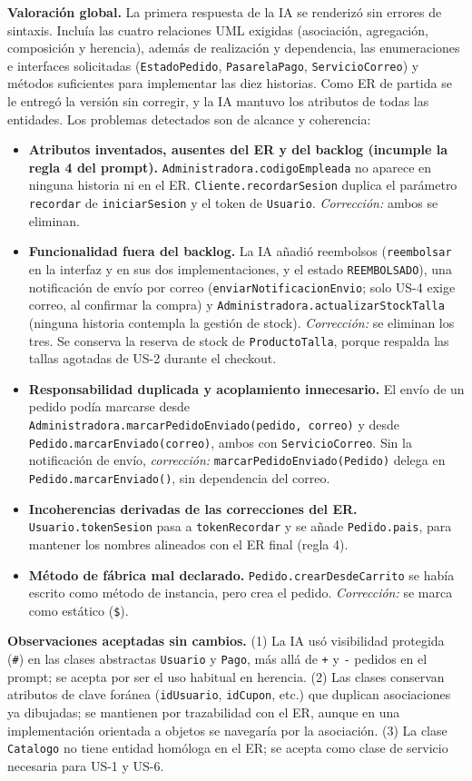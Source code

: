 \textbf{Valoración global.} La primera respuesta de la IA se renderizó sin errores de sintaxis. Incluía las cuatro relaciones UML exigidas (asociación, agregación, composición y herencia), además de realización y dependencia, las enumeraciones e interfaces solicitadas (\texttt{EstadoPedido}, \texttt{PasarelaPago}, \texttt{ServicioCorreo}) y métodos suficientes para implementar las diez historias. Como ER de partida se le entregó la versión sin corregir, y la IA mantuvo los atributos de todas las entidades. Los problemas detectados son de alcance y coherencia:
\begin{itemize}[leftmargin=*,nosep]
\item \textbf{Atributos inventados, ausentes del ER y del backlog (incumple la regla 4 del prompt).} \texttt{Administradora.codigoEmpleada} no aparece en ninguna historia ni en el ER. \texttt{Cliente.recordarSesion} duplica el parámetro \texttt{recordar} de \texttt{iniciarSesion} y el token de \texttt{Usuario}. \emph{Corrección:} ambos se eliminan.
\item \textbf{Funcionalidad fuera del backlog.} La IA añadió reembolsos (\texttt{reembolsar} en la interfaz y en sus dos implementaciones, y el estado \texttt{REEMBOLSADO}), una notificación de envío por correo (\texttt{enviarNotificacionEnvio}; solo US-4 exige correo, al confirmar la compra) y \texttt{Administradora.actualizarStockTalla} (ninguna historia contempla la gestión de stock). \emph{Corrección:} se eliminan los tres. Se conserva la reserva de stock de \texttt{ProductoTalla}, porque respalda las tallas agotadas de US-2 durante el checkout.
\item \textbf{Responsabilidad duplicada y acoplamiento innecesario.} El envío de un pedido podía marcarse desde \texttt{Administradora.marcarPedidoEnviado(pedido, correo)} y desde \texttt{Pedido.marcarEnviado(correo)}, ambos con \texttt{ServicioCorreo}. Sin la notificación de envío, \emph{corrección:} \texttt{marcarPedidoEnviado(Pedido)} delega en \texttt{Pedido.marcarEnviado()}, sin dependencia del correo.
\item \textbf{Incoherencias derivadas de las correcciones del ER.} \texttt{Usuario.tokenSesion} pasa a \texttt{tokenRecordar} y se añade \texttt{Pedido.pais}, para mantener los nombres alineados con el ER final (regla 4).
\item \textbf{Método de fábrica mal declarado.} \texttt{Pedido.crearDesdeCarrito} se había escrito como método de instancia, pero crea el pedido. \emph{Corrección:} se marca como estático (\texttt{\$}).
\end{itemize}
\textbf{Observaciones aceptadas sin cambios.} (1) La IA usó visibilidad protegida (\texttt{\#}) en las clases abstractas \texttt{Usuario} y \texttt{Pago}, más allá de \texttt{+} y \texttt{-} pedidos en el prompt; se acepta por ser el uso habitual en herencia. (2) Las clases conservan atributos de clave foránea (\texttt{idUsuario}, \texttt{idCupon}, etc.) que duplican asociaciones ya dibujadas; se mantienen por trazabilidad con el ER, aunque en una implementación orientada a objetos se navegaría por la asociación. (3) La clase \texttt{Catalogo} no tiene entidad homóloga en el ER; se acepta como clase de servicio necesaria para US-1 y US-6.
